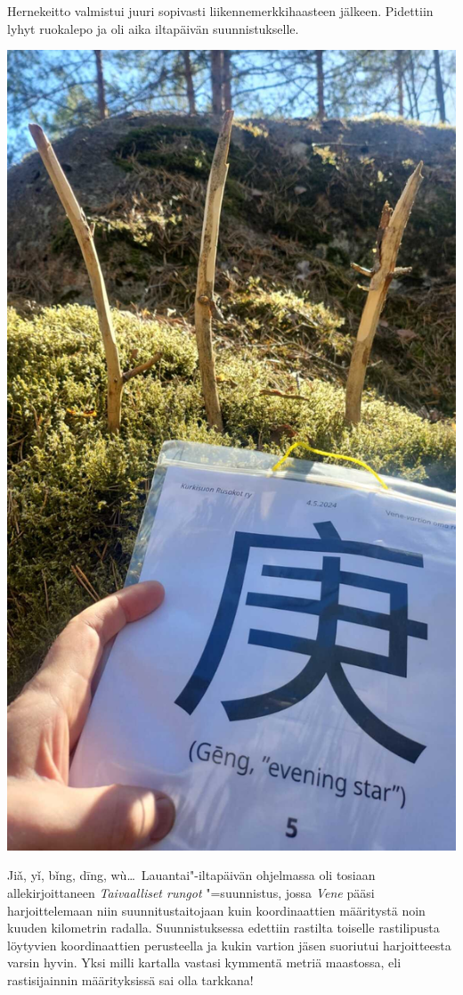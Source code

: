 \begin{multicols}{2}
Hernekeitto valmistui juuri sopivasti liikennemerkkihaasteen jälkeen. Pidettiin lyhyt ruokalepo ja oli aika iltapäivän suunnistukselle.

\vspace*{0.16cm}
\noindent\includegraphics[width=\linewidth]{assets/vene11}

Jiǎ, yǐ, bǐng, dīng, wù\ldots\ Lauantai"-iltapäivän ohjelmassa oli tosiaan allekirjoittaneen \textit{Taivaalliset rungot} "=suunnistus, jossa \textit{Vene} pääsi harjoittelemaan niin suunnitustaitojaan kuin koordinaattien määritystä noin kuuden kilometrin radalla. Suunnistuksessa edettiin rastilta toiselle rastilipusta löytyvien koordinaattien perusteella ja kukin vartion jäsen suoriutui harjoitteesta varsin hyvin. Yksi milli kartalla vastasi kymmentä metriä maastossa, eli rastisijainnin määrityksissä sai olla tarkkana!


\end{multicols}
